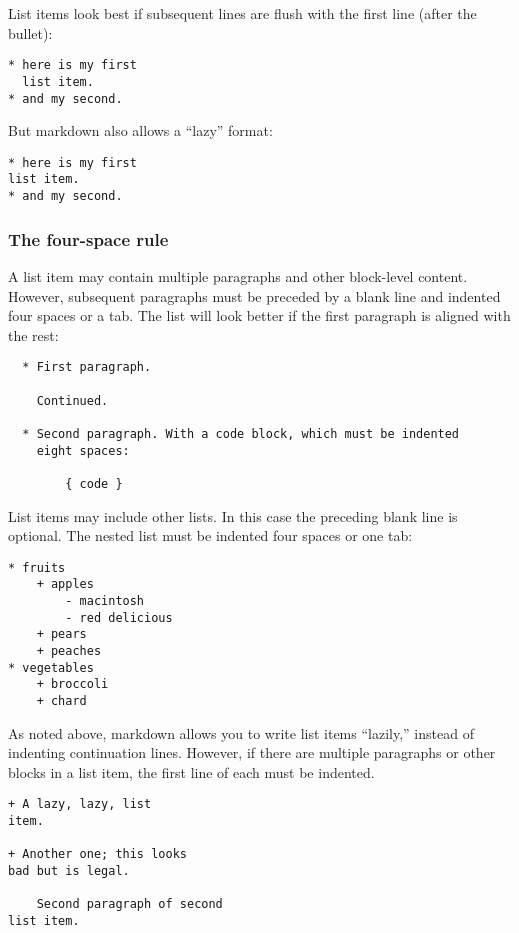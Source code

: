 \documentclass[]{article}
\begin{document}
List items look best if subsequent lines are flush with the first line
(after the bullet):

\begin{verbatim}
* here is my first
  list item.
* and my second.
\end{verbatim}

But markdown also allows a ``lazy'' format:

\begin{verbatim}
* here is my first
list item.
* and my second.
\end{verbatim}

\subsubsection{The four-space rule}\label{the-four-space-rule}

A list item may contain multiple paragraphs and other block-level
content. However, subsequent paragraphs must be preceded by a blank line
and indented four spaces or a tab. The list will look better if the
first paragraph is aligned with the rest:

\begin{verbatim}
  * First paragraph.

    Continued.

  * Second paragraph. With a code block, which must be indented
    eight spaces:

        { code }
\end{verbatim}

List items may include other lists. In this case the preceding blank
line is optional. The nested list must be indented four spaces or one
tab:

\begin{verbatim}
* fruits
    + apples
        - macintosh
        - red delicious
    + pears
    + peaches
* vegetables
    + broccoli
    + chard
\end{verbatim}

As noted above, markdown allows you to write list items ``lazily,''
instead of indenting continuation lines. However, if there are multiple
paragraphs or other blocks in a list item, the first line of each must
be indented.

\begin{verbatim}
+ A lazy, lazy, list
item.

+ Another one; this looks
bad but is legal.

    Second paragraph of second
list item.
\end{verbatim}
\end{document}
